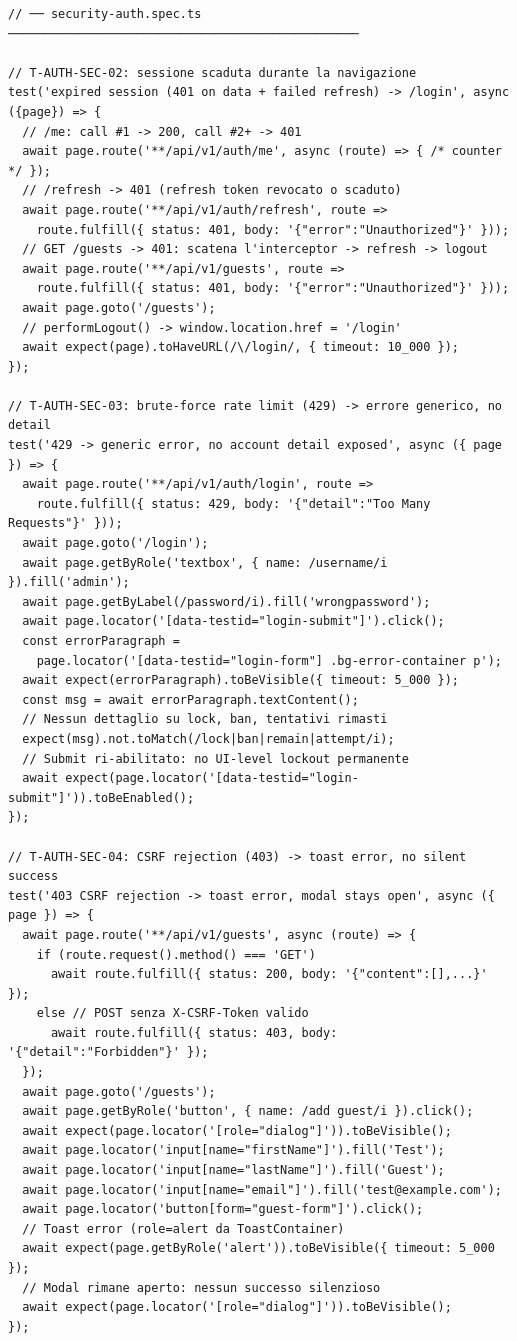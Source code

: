﻿\documentclass[a4paper,12pt]{report}
\begin{document}
\begin{securebox}[title={Codice Sicuro --- 11 test E2E attack-path (3 suite)}]
\begin{lstlisting}[style=typescript]
// ── security-auth.spec.ts ─────────────────────────────────────────────────

// T-AUTH-SEC-02: sessione scaduta durante la navigazione
test('expired session (401 on data + failed refresh) -> /login', async ({page}) => {
  // /me: call #1 -> 200, call #2+ -> 401
  await page.route('**/api/v1/auth/me', async (route) => { /* counter */ });
  // /refresh -> 401 (refresh token revocato o scaduto)
  await page.route('**/api/v1/auth/refresh', route =>
    route.fulfill({ status: 401, body: '{"error":"Unauthorized"}' }));
  // GET /guests -> 401: scatena l'interceptor -> refresh -> logout
  await page.route('**/api/v1/guests', route =>
    route.fulfill({ status: 401, body: '{"error":"Unauthorized"}' }));
  await page.goto('/guests');
  // performLogout() -> window.location.href = '/login'
  await expect(page).toHaveURL(/\/login/, { timeout: 10_000 });
});

// T-AUTH-SEC-03: brute-force rate limit (429) -> errore generico, no detail
test('429 -> generic error, no account detail exposed', async ({ page }) => {
  await page.route('**/api/v1/auth/login', route =>
    route.fulfill({ status: 429, body: '{"detail":"Too Many Requests"}' }));
  await page.goto('/login');
  await page.getByRole('textbox', { name: /username/i }).fill('admin');
  await page.getByLabel(/password/i).fill('wrongpassword');
  await page.locator('[data-testid="login-submit"]').click();
  const errorParagraph =
    page.locator('[data-testid="login-form"] .bg-error-container p');
  await expect(errorParagraph).toBeVisible({ timeout: 5_000 });
  const msg = await errorParagraph.textContent();
  // Nessun dettaglio su lock, ban, tentativi rimasti
  expect(msg).not.toMatch(/lock|ban|remain|attempt/i);
  // Submit ri-abilitato: no UI-level lockout permanente
  await expect(page.locator('[data-testid="login-submit"]')).toBeEnabled();
});

// T-AUTH-SEC-04: CSRF rejection (403) -> toast error, no silent success
test('403 CSRF rejection -> toast error, modal stays open', async ({ page }) => {
  await page.route('**/api/v1/guests', async (route) => {
    if (route.request().method() === 'GET')
      await route.fulfill({ status: 200, body: '{"content":[],...}' });
    else // POST senza X-CSRF-Token valido
      await route.fulfill({ status: 403, body: '{"detail":"Forbidden"}' });
  });
  await page.goto('/guests');
  await page.getByRole('button', { name: /add guest/i }).click();
  await expect(page.locator('[role="dialog"]')).toBeVisible();
  await page.locator('input[name="firstName"]').fill('Test');
  await page.locator('input[name="lastName"]').fill('Guest');
  await page.locator('input[name="email"]').fill('test@example.com');
  await page.locator('button[form="guest-form"]').click();
  // Toast error (role=alert da ToastContainer)
  await expect(page.getByRole('alert')).toBeVisible({ timeout: 5_000 });
  // Modal rimane aperto: nessun successo silenzioso
  await expect(page.locator('[role="dialog"]')).toBeVisible();
});


\end{lstlisting}
\end{securebox}
\end{document}
